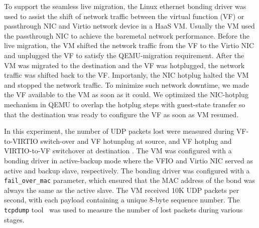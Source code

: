 

To support the seamless live migration, the Linux ethernet
bonding driver was used to assist the shift of network traffic
between the virtual function (VF) or passthrough NIC and
Virtio network device in a HaaS VM. Usually the VM used the
passthrough NIC to achieve the baremetal network performance.
Before the live migration, the VM shifted the network traffic
from the VF to the Virtio NIC and unplugged the VF to satisfy
the QEMU-migration requirement. After the VM was migrated to
the destination and the VF was hotplugged, the network traffic
was shifted back to the VF. Importanly, the NIC hotplug halted
the VM and stopped the network traffic. To minimize such
network downtime, we made the VF available to the VM as soon
as it could. We optimized the NIC-hotplug mechanism in QEMU
to overlap the hotplug steps with
guest-state transfer so that the destination was ready to
configure the VF as soon as VM resumed.

In this experiment, the number of UDP packets lost were measured
during VF-to-VIRTIO switch-over and VF hotunplug at source, and 
VF hotplug and VIRTIO-to-VF switchover at destination . The VM
was configured with a bonding driver in active-backup mode
where the VFIO and Virtio NIC served as active and backup
slave, respectively. The bonding driver was configured with a
\texttt{fail\_over\_mac} parameter, which ensured that the MAC
address of the bond was always the same as the active slave.
The VM received 10K UDP packets per second, with each payload
containing a unique 8-byte sequence number. 
The {\tt tcpdump} tool~\cite{tcpdump} was used to
measure the number of lost packets during various stages. 


